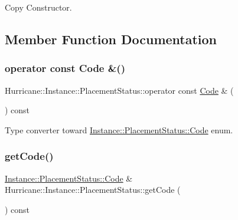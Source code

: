 Copy Constructor. 

\subsection{Member Function Documentation}
\mbox{\label{classHurricane_1_1Instance_1_1PlacementStatus_a375d2547ed3e8a127e34b0ee3ca14ad6}} 
\subsubsection{\texorpdfstring{operator const Code \&()}{operator const Code \&()}}
{\footnotesize\ttfamily Hurricane\+::\+Instance\+::\+Placement\+Status\+::operator const \hyperlink{classHurricane_1_1Instance_1_1PlacementStatus_af76cc0838783b3eb3a515eb3c3e0f7bf}{Code} \& (\begin{DoxyParamCaption}{ }\end{DoxyParamCaption}) const\hspace{0.3cm}{\ttfamily [inline]}}

Type converter toward \hyperlink{classHurricane_1_1Instance_1_1PlacementStatus_af76cc0838783b3eb3a515eb3c3e0f7bf}{Instance\+::\+Placement\+Status\+::\+Code} enum. \mbox{\label{classHurricane_1_1Instance_1_1PlacementStatus_aa907067c594076ed8422bf6c949c8731}} 
\subsubsection{\texorpdfstring{get\+Code()}{getCode()}}
{\footnotesize\ttfamily \hyperlink{classHurricane_1_1Instance_1_1PlacementStatus_af76cc0838783b3eb3a515eb3c3e0f7bf}{Instance\+::\+Placement\+Status\+::\+Code} \& Hurricane\+::\+Instance\+::\+Placement\+Status\+::get\+Code (\begin{DoxyParamCaption}{ }\end{DoxyParamCaption}) const\hspace{0.3cm}{\ttfamily [inline]}}

